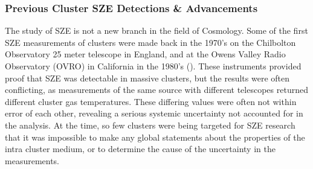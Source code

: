\documentclass[manuscript]{aastex}
\begin{document}


    


\subsubsection{\textbf{Previous Cluster SZE Detections \& Advancements}}

The study of SZE is not a new branch in the field of Cosmology. Some of the first SZE measurements of clusters were made back in the 1970's on the Chilbolton Observatory 25 meter telescope in England, and at the Owens Valley Radio Observatory (OVRO) in California in the 1980's (\cite{Birkinshaw1999}). These instruments provided proof that SZE was detectable in massive clusters, but the results were often conflicting, as measurements of the same source with different telescopes returned different cluster gas temperatures. These differing values were often not within error of each other, revealing a serious systemic uncertainty not accounted for in the analysis. At the time, so few clusters were being targeted for SZE research that it was impossible to make any global statements about the properties of the intra cluster medium, or to determine the cause of the uncertainty in the measurements. 
\end{document}
